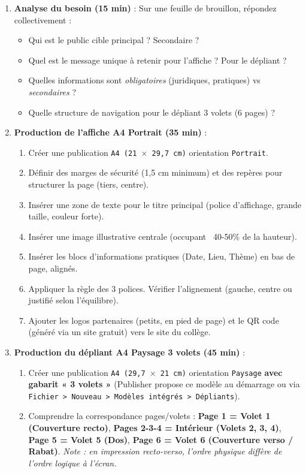 \documentclass[11pt]{article}
\newcommand{\cle}[1]{{\popxbold\color{popdark}#1}}
\begin{document}
\begin{enumerate}
    \item \textbf{Analyse du besoin (15 min)} : Sur une feuille de brouillon, répondez collectivement :
    \begin{itemize}
        \item Qui est le public cible principal ? Secondaire ?
        \item Quel est le message unique à retenir pour l'affiche ? Pour le dépliant ?
        \item Quelles informations sont \emph{obligatoires} (juridiques, pratiques) vs \emph{secondaires} ?
        \item Quelle structure de navigation pour le dépliant 3 volets (6 pages) ?
    \end{itemize}
    \item \textbf{Production de l'affiche A4 Portrait (35 min)} :
    \begin{enumerate}
        \item Créer une publication \texttt{A4 (21 $\times$ 29,7 cm)} orientation \texttt{Portrait}.
        \item Définir des \cle{marges} de sécurité (1,5 cm minimum) et des \cle{repères} pour structurer la page (tiers, centre).
        \item Insérer une \cle{zone de texte} pour le titre principal (police d'affichage, grande taille, couleur forte).
        \item Insérer une \cle{image} illustrative centrale (occupant ~40-50\% de la hauteur).
        \item Insérer les blocs d'informations pratiques (Date, Lieu, Thème) en bas de page, alignés.
        \item Appliquer la règle des 3 polices. Vérifier l'alignement (gauche, centre ou justifié selon l'équilibre).
        \item Ajouter les logos partenaires (petits, en pied de page) et le QR code (généré via un site gratuit) vers le site du collège.
    \end{enumerate}
    \item \textbf{Production du dépliant A4 Paysage 3 volets (45 min)} :
    \begin{enumerate}
        \item Créer une publication \texttt{A4 (29,7 $\times$ 21 cm)} orientation \texttt{Paysage} \textbf{avec gabarit « 3 volets »} (Publisher propose ce modèle au démarrage ou via \texttt{Fichier > Nouveau > Modèles intégrés > Dépliants}).
        \item Comprendre la correspondance pages/volets : \textbf{Page 1 = Volet 1 (Couverture recto)}, \textbf{Pages 2-3-4 = Intérieur (Volets 2, 3, 4)}, \textbf{Page 5 = Volet 5 (Dos)}, \textbf{Page 6 = Volet 6 (Couverture verso / Rabat)}. \emph{Note : en impression recto-verso, l'ordre physique diffère de l'ordre logique à l'écran.}

\end{enumerate}
\end{enumerate}
\end{document}

